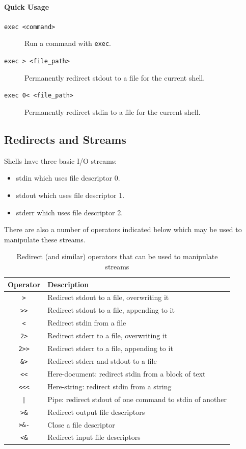 \documentclass{article}
\newcommand{\code}[1]{\texttt{#1}}
\begin{document}
\paragraph{Quick Usage}

\begin{description}
    \item[\code{exec <command>}] Run a command with \code{exec}.
    \item[\code{exec > <file\_path>}] Permanently redirect stdout to a file for the current shell.
    \item[\code{exec 0< <file\_path>}] Permanently redirect stdin to a file for the current shell.
\end{description}

\subsection{Redirects and Streams}

Shells have three basic I/O streams:

\begin{itemize}
    \item stdin which uses file descriptor 0.
    \item stdout which uses file descriptor 1.
    \item stderr which uses file descriptor 2.
\end{itemize}

There are also a number of operators indicated below which may be used to manipulate these streams.

\begin{table}[H]
    \centering
    \begin{tabular}{|c|l|}
        \hline
        \textbf{Operator} & \textbf{Description} \\
        \hline
        \code{>} & Redirect stdout to a file, overwriting it \\
        \code{>>} & Redirect stdout to a file, appending to it \\
        \code{<} & Redirect stdin from a file \\
        \code{2>} & Redirect stderr to a file, overwriting it \\
        \code{2>>} & Redirect stderr to a file, appending to it \\
        \code{\&>} & Redirect stderr and stdout to a file \\
        \code{<<} & Here-document: redirect stdin from a block of text \\
        \code{<<<} & Here-string: redirect stdin from a string \\
        \code{|} & Pipe: redirect stdout of one command to stdin of another \\
        \code{>\&} & Redirect output file descriptors \\
        \code{>\&-} & Close a file descriptor \\
        \code{<\&} & Redirect input file descriptors \\
        \hline
    \end{tabular}
    \caption{Redirect (and similar) operators that can be used to manipulate streams}
\end{table}
\end{document}
